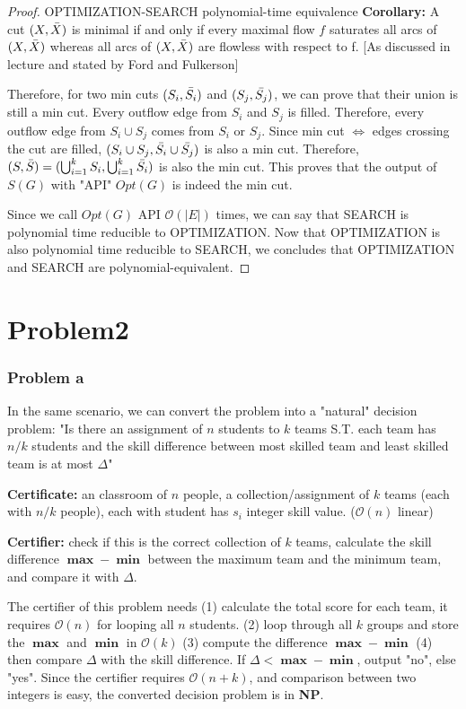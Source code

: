 \documentclass[openany]{article}
\begin{document}
\begin{proof}{}{OPTIMIZATION-SEARCH polynomial-time equivalence}
\textbf{Corollary: } A cut $(X,\Bar{X})$ is minimal if and only if every maximal flow $f$ saturates all arcs of $(X,\Bar{X})$ whereas all arcs of $(X,\Bar{X})$ are flowless with respect to f. [As discussed in lecture and stated by Ford and Fulkerson]

\qquad Therefore, for two min cuts $(S_i,\Bar{S_i})$ and $(S_j, \Bar{S_j})$, we can prove that their union is still a min cut. Every outflow edge from $S_i$ and $S_j$ is filled. Therefore, every outflow edge from $S_i \cup S_j$ comes from $S_i$ or $S_j$. Since min cut $\Leftrightarrow$ edges crossing the cut are filled, $(S_i \cup S_j, \Bar{S_i} \cup \Bar{S_j})$ is also a min cut. Therefore, $(S,\Bar{S}) = (\bigcup_{i=1}^{k}{S_i},\bigcup_{i=1}^{k}\Bar{S_i})$ is also the min cut. This proves that the output of $S(G)$ with "API" $Opt(G)$ is indeed the min cut.

Since we call $Opt(G)$ API $\mathcal{O}(|E|)$ times, we can say that SEARCH is polynomial time reducible to OPTIMIZATION. Now that OPTIMIZATION is also polynomial time reducible to SEARCH, we concludes that OPTIMIZATION and SEARCH are polynomial-equivalent.


\end{proof}


\section*{Problem2}
\subsubsection*{Problem a}
In the same scenario, we can convert the problem into a "natural" decision problem: "Is there an assignment of $n$ students to $k$ teams S.T. each team has $n/k$ students and the skill difference between most skilled team and least skilled team is at most $\Delta$" 

\textbf{Certificate:} an classroom of $n$ people, a collection/assignment of $k$ teams (each with $n/k$ people), each with student has $s_i$ integer skill value. ($\mathcal{O}(n)$ linear)

\textbf{Certifier:} check if this is the correct collection of $k$ teams, calculate the skill difference $\mathbf{\max}-\mathbf{\min}$ between the maximum team and the minimum team, and compare it with $\Delta$.

The certifier of this problem needs (1) calculate the total score for each team, it requires $\mathcal{O}(n)$ for looping all $n$ students. (2) loop through all $k$ groups and store the $\mathbf{\max}$ and $\mathbf{\min}$ in $\mathcal{O}(k)$ (3) compute the difference $\mathbf{\max} - \mathbf{\min}$ (4) then compare $\Delta$ with the skill difference. If $\Delta < \mathbf{\max} - \mathbf{\min}$, output "no", else "yes". Since the certifier requires $\mathcal{O}(n+k)$, and comparison between two integers is easy, the converted decision problem is in \textbf{NP}.
\end{document}
